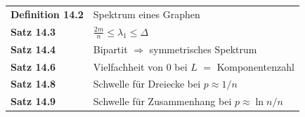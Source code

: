 \begin{merksatz}
\begin{center}
\renewcommand{\arraystretch}{1.5}
\begin{tabular}{@{}P{3.0cm}P{5.6cm}@{}}
\toprule
\textbf{Definition 14.2} & Spektrum eines Graphen\\
\textbf{Satz 14.3} & $\frac{2m}{n} \le \lambda_1 \le \Delta$\\
\textbf{Satz 14.4} & Bipartit $\Rightarrow$ symmetrisches Spektrum\\
\textbf{Satz 14.6} & Vielfachheit von $0$ bei $L$ $=$ Komponentenzahl\\
\textbf{Satz 14.8} & Schwelle für Dreiecke bei $p \approx 1/n$\\
\textbf{Satz 14.9} & Schwelle für Zusammenhang bei $p \approx \ln n / n$\\
\bottomrule
\end{tabular}
\end{center}

\begin{center}
\begin{minipage}{0.88\textwidth}
\end{minipage}
\end{center}
\end{merksatz}
